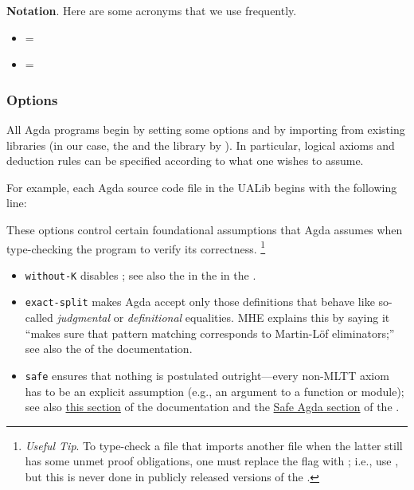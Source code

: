 
\noindent \textbf{Notation}. Here are some acronyms that we use frequently.

\begin{itemize}
\tightlist
\item \mhe = \MHE
\item \mltt = \MLTT
\end{itemize}

\subsubsection{Options}\label{options}
All Agda programs begin by setting some options and by importing from existing libraries (in our case, the \agdastdlib and the \TypeTopology library by \mhe). In particular, logical axioms and deduction rules can be specified according to what one wishes to assume.

For example, each Agda source code file in the UALib begins with the following line:
\ccpad
\begin{code}%
\>[0]\AgdaSymbol{\{-\#}\AgdaSpace{}%
\AgdaSpace{}%
\AgdaSpace{}%
\AgdaSpace{}%
\AgdaSpace{}%
\AgdaSymbol{\#-\}}\<%
\end{code}
\ccpad
These options control certain foundational assumptions that Agda assumes when type-checking the program to verify its correctness.%
\footnote{\emph{Useful Tip}. To type-check a file that imports another file when the latter still has some unmet proof obligations, one must replace the  flag with ; i.e., use
\AgdaSymbol{\{-\#}\AgdaSpace{}%
\AgdaSpace{}%
\AgdaSpace{}%
\AgdaSpace{}%
\AgdaSpace{}%
\AgdaSymbol{\#-\}}, but this is never done in publicly released versions of the \ualib.}

\begin{itemize}
\item
  \texttt{without-K} disables \axiomk; see also the in the \agdarefk in the \agdaref.
\item
  \texttt{exact-split} makes Agda accept only those definitions that
  behave like so-called \emph{judgmental} or \emph{definitional}
  equalities. MHE explains this by saying it ``makes sure that pattern
  matching corresponds to Martin-Löf eliminators;'' see also the
  \patternmatching of the \agdatools documentation.
\item
  \texttt{safe} ensures that nothing is postulated outright---every non-MLTT axiom has to be an explicit assumption (e.g., an argument to a function or module); see also \href{https://agda.readthedocs.io/en/v2.6.1/tools/command-line-options.html\#cmdoption-safe}{this section} of the \agdatools documentation and the \href{https://agda.readthedocs.io/en/v2.6.1/language/safe-agda.html\#safe-agda}{Safe Agda section} of the \agdaref.
\end{itemize}


